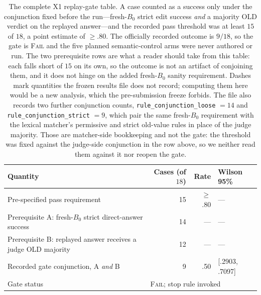\documentclass[letterpaper]{article}
\begin{document}
\begin{table}[t]
\centering
\small
\begin{tabular}{lrrl}
\toprule
Quantity & Cases (of \(18\)) & Rate & Wilson 95\% \\
\midrule
Pre-specified pass requirement & 15 & \(\ge\).80 & --- \\
\midrule
Prerequisite A: fresh-\(B_0\) strict direct-answer success & 14 & --- & --- \\
Prerequisite B: replayed answer receives a judge OLD majority & 12 & --- & --- \\
\midrule
Recorded gate conjunction, A \emph{and} B & 9 & .50 & [.2903, .7097] \\
\midrule
Gate status & \multicolumn{3}{l}{\textsc{Fail}; stop rule invoked} \\
\bottomrule
\end{tabular}
\caption{The complete X1 replay-gate table.  A case counted as a success only
under the conjunction fixed before the run---fresh-\(B_0\) strict edit success
\emph{and} a majority OLD verdict on the replayed answer---and the recorded
pass threshold was at least \(15\) of \(18\), a point estimate of \(\ge\).80.
The officially recorded outcome is \(9/18\), so the gate is \textsc{Fail} and
the five planned semantic-control arms were never authored or run.  The two
prerequisite rows are what a reader should take from this table: each falls
short of \(15\) on its own, so the outcome is not an artifact of conjoining
them, and it does not hinge on the added fresh-\(B_0\) sanity requirement.
Dashes mark quantities the frozen results file does not record; computing them
here would be a new analysis, which the pre-submission freeze forbids.  The
file also records two further conjunction counts, \texttt{rule\_conjunction\_loose}
\(=14\) and \texttt{rule\_conjunction\_strict} \(=9\), which pair the same
fresh-\(B_0\) requirement with the lexical matcher's permissive and strict
old-value rules in place of the judge majority.  Those are matcher-side
bookkeeping and not the gate: the threshold was fixed against the judge-side
conjunction in the row above, so we neither read them against it nor reopen the
gate.}
\label{tab:x1-gate}
\end{table}
\end{document}
